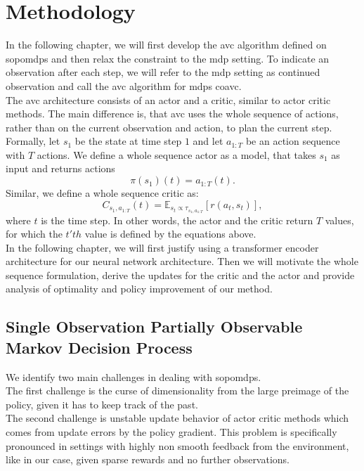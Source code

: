 
\chapter{Methodology}
\label{chapter:Methodology}
In the following chapter, we will first develop the \ac{avc} algorithm defined on \ac{sopomdp}s and then relax 
the constraint to the \ac{mdp} setting. To indicate an observation after each step, we will refer to the \ac{mdp} setting as continued observation 
and call the \ac{avc} algorithm for \ac{mdp}s \ac{coavc}.\\

The \ac{avc} architecture consists of an actor and a critic, similar to actor critic methods. The main difference is, that \ac{avc} uses the whole sequence of 
actions, rather than on the current observation and action, to plan the current step.\\ 

Formally, let $s_{1}$ be the state at time step $1$ and let $a_{1:T}$ be an action sequence with $T$ actions. 
We define a whole sequence actor as a model, that takes $s_{1}$ as input and returns actions 
\begin{equation}
    \label{eq:def_wsa}
    \pi(s_{1})(t) = a_{1:T}(t).
\end{equation}
Similar, we define a whole sequence critic as: 
\begin{equation}
    \label{eq:def_wsc}
    C_{s_1, a_{1:T}}(t) = \mathbb{E}_{s_t \propto \tau_{s_1, a_{1:T}}}\left[r(a_t, s_t)\right],
\end{equation}
where $t$ is the time step. In other words, the actor and the critic return $T$ values, for which the $t'th$ value is defined by the 
equations above.\\

In the following chapter, we will first justify using a transformer encoder architecture for our neural network architecture. 
Then we will motivate the whole sequence formulation, derive the updates for the critic and the 
actor and provide analysis of optimality and policy improvement of our method. 

\section{Single Observation Partially Observable Markov Decision Process}
We identify two main challenges in dealing with \ac{sopomdp}s. \\
The first challenge is the curse of dimensionality from the large preimage of the policy, given it has to keep track 
of the past. \\
The second challenge is unstable update behavior of actor critic methods which comes from update errors by the policy gradient. This problem 
is specifically pronounced in settings with highly non smooth feedback from the environment, like in our case, given sparse rewards 
and no further observations.
